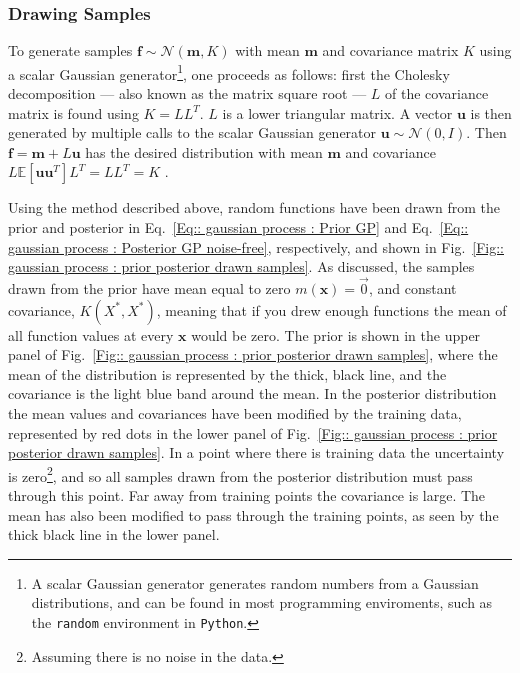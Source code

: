 \documentclass[twoside,english]{uiofysmaster}
\begin{document}
\subsubsection{Drawing Samples}

To generate samples $\textbf{f} \sim \mathcal{N}(\textbf{m}, K)$ with mean $\textbf{m}$ and covariance matrix $K$ using a scalar Gaussian generator\footnote{A scalar Gaussian generator generates random numbers from a Gaussian distributions, and can be found in most programming enviroments, such as the \verb|random| environment in \verb|Python|.}, one proceeds as follows: first the Cholesky decomposition --- also known as the matrix square root ---  $L$ of the covariance matrix is found using $K = LL^T$. $L$ is a lower triangular matrix. A vector $\textbf{u}$ is then generated by multiple calls to the scalar Gaussian generator $\textbf{u} \sim \mathcal{N}(0, I)$. Then $\textbf{f} = \textbf{m} + L \textbf{u}$ has the desired distribution with mean $\textbf{m}$ and covariance $L \mathbb{E} [\textbf{u} \textbf{u}^T]L^T = LL^T = K$ \cite{rasmussen2006gaussian}.

Using the method described above, random functions have been drawn from the prior and posterior in Eq.~\ref{Eq:: gaussian process : Prior GP} and Eq.~\ref{Eq:: gaussian process : Posterior GP noise-free}, respectively, and shown in Fig.~\ref{Fig:: gaussian process : prior posterior drawn samples}. As discussed, the samples drawn from the prior have mean equal to zero $m(\textbf{x})=\vec{0}$, and constant covariance, $K(X^*, X^*)$, meaning that if you drew enough functions the mean of all function values at every $\textbf{x}$ would be zero. The prior is shown in the upper panel of Fig.~\ref{Fig:: gaussian process : prior posterior drawn samples}, where the mean of the distribution is represented by the thick, black line, and the covariance is the light blue band around the mean. In the posterior distribution the mean values and covariances have been modified by the training data, represented by red dots in the lower panel of Fig.~\ref{Fig:: gaussian process : prior posterior drawn samples}. In a point where there is training data the uncertainty is zero\footnote{Assuming there is no noise in the data.}, and so all samples drawn from the posterior distribution must pass through this point. Far away from training points the covariance is large. The mean has also been modified to pass through the training points, as seen by the thick black line in the lower panel.
\end{document}

